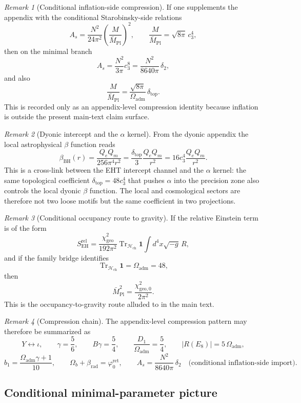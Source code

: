 \documentclass[11pt,a4paper]{article}
\theoremstyle{definition}
\theoremstyle{remark}
\newtheorem*{remark}{Remark}
\DeclareMathOperator{\tr}{Tr}
\newcommand{\inv}{\iota}
\newcommand{\Mpl}{\bar M_{\mathrm{Pl}}}
\newcommand{\cthree}{c_3}
\newcommand{\phiz}{\varphi_0^{\mathrm{ret}}}
\newcommand{\deltatop}{\delta_{\mathrm{top}}}
\newcommand{\bone}{b_1}
\newcommand{\Oadm}{\Omega_{\mathrm{adm}}}
\newcommand{\chigeo}{\chi_{\mathrm{geo}}}
\newcommand{\chigeozero}{\chi_{\mathrm{geo},0}}
\begin{document}
\begin{remark}[Conditional inflation-side compression]
If one supplements the appendix with the conditional Starobinsky-side relations
\[
A_s=\frac{N^2}{24\pi^2}\left(\frac{M}{\Mpl}\right)^2,
\qquad
\frac{M}{\Mpl}=\sqrt{8\pi}\,\cthree^4,
\]
then on the minimal branch
\[
A_s=\frac{N^2}{3\pi}\cthree^8=\frac{N^2}{8640\pi}\,\delta_2,
\]
and also
\[
\frac{M}{\Mpl}=\frac{\sqrt{8\pi}}{\Oadm}\,\deltatop.
\]
This is recorded only as an appendix-level compression identity because inflation is outside the present main-text claim surface.
\end{remark}

\begin{remark}[Dyonic intercept and the $\alpha$ kernel]
From the dyonic appendix the local astrophysical $\beta$ function reads
\[
\beta_{\mathrm{BH}}(r)=\frac{Q_eQ_m}{256\pi^4 r^2}=\frac{\deltatop}{3}\frac{Q_eQ_m}{r^2}=16\cthree^4\frac{Q_eQ_m}{r^2}.
\]
This is a cross-link between the EHT intercept channel and the $\alpha$ kernel: the same topological coefficient $\deltatop=48\cthree^4$ that pushes $\alpha$ into the precision zone also controls the local dyonic $\beta$ function. The local and cosmological sectors are therefore not two loose motifs but the same coefficient in two projections.
\end{remark}

\begin{remark}[Conditional occupancy route to gravity]
If the relative Einstein term is of the form
\[
S_{\mathrm{EH}}^{\mathrm{rel}}
=
\frac{\chigeo^2}{192\pi^2}\tr_{\mathcal H_{\mathrm{ch}}}\mathbf 1
\int d^4x\sqrt{-g}\,R,
\]
and if the family bridge identifies
\[
\tr_{\mathcal H_{\mathrm{ch}}}\mathbf 1=\Oadm=48,
\]
then
\[
\Mpl^2=\frac{\chigeozero^2}{2\pi^2}.
\]
This is the occupancy-to-gravity route alluded to in the main text.
\end{remark}

\begin{remark}[Compression chain]
The appendix-level compression pattern may therefore be summarized as
\[
Y \leftrightarrow \inv,
\qquad
\gamma=\frac56,
\qquad
B\gamma=\frac54,
\qquad
\frac{D_1}{\Oadm}=\frac54,
\qquad
|R(E_8)|=5\,\Oadm,
\]
\[
\bone=\frac{\Oadm\gamma+1}{10},
\qquad
\Omega_b+\beta_{\mathrm{rad}}=\phiz,
\qquad
A_s=\frac{N^2}{8640\pi}\,\delta_2
\quad
\text{(conditional inflation-side import)}.
\]
\end{remark}

\subsection{Conditional minimal-parameter picture}
\end{document}
